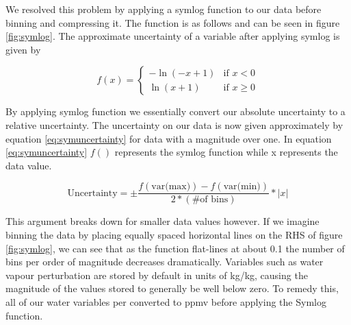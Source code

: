 \documentclass[12pt]{article}
\begin{document}
We resolved this problem by applying a symlog function to our data before binning and compressing it. The function is as follows and can be seen in figure \ref{fig:symlog}. The approximate uncertainty of a variable after applying symlog is given by

\begin{equation}
\label{eq:symlogfunc}
f(x) = \begin{cases} 
-\ln(-x + 1) & \text{if } x < 0 \\ 
\ln(x + 1) & \text{if } x \ge 0 
\end{cases}
\end{equation}

By applying symlog function we essentially convert our absolute uncertainty to a relative uncertainty. The uncertainty on our data is now given approximately by equation \ref{eq:symuncertainty} for data with a magnitude over one. In equation \ref{eq:symuncertainty} $f()$ represents the symlog function while x represents the data value.

\begin{equation}
\label{eq:symuncertainty}
\text{Uncertainty} = \pm \frac{f(\text{var(max)}) - f(\text{var(min)})}{2 * (\text{\# of bins})} * |x|
\end{equation}

This argument breaks down for smaller data values however. If we imagine binning the data by placing equally spaced horizontal lines on the RHS of figure \ref{fig:symlog}, we can see that as the function flat-lines at about 0.1 the number of bins per order of magnitude decreases dramatically. Variables such as water vapour perturbation are stored by default in units of kg/kg, causing the magnitude of the values stored to generally be well below zero. To remedy this, all of our water variables per converted to ppmv before applying the Symlog function.
\end{document}

